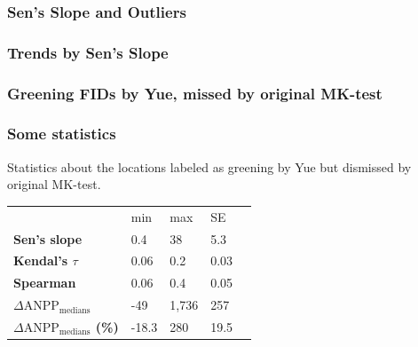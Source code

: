 \documentclass[serif, xcolor={dvipsnames}]{beamer} %
\begin{document}
\begin{frame}
 \frametitle{Sen's Slope and Outliers}
\begin{center}
\end{center}
\end{frame}
\begin{frame}
\frametitle{Trends by Sen's Slope}
\begin{center}
\end{center}
\end{frame}
\begin{frame}
\frametitle{Greening FIDs by Yue, missed by original MK-test}
\begin{center}
\end{center}
\end{frame}
\begin{frame}
\frametitle{Some statistics}
Statistics about the locations labeled as greening by Yue but dismissed by original MK-test.
\begin{table}[!ht]
\centering
\captionsetup{singlelinecheck=false, format=hang}
\label{tab:Trendcounts}
\begin{tabular}{lllll}
\bottomrule
\rowcolor{shadecolor} 
&  min & max & SE \\ 
\rowcolor{aliceblue} 
\textbf{Sen's slope} & 0.4 & 38 & 5.3 \\
\textbf{Kendal's $\tau$}  & 0.06 & 0.2 &  0.03 \\
\rowcolor{aliceblue} 
\textbf{Spearman}  & 0.06  & 0.4 & 0.05  \\
\textbf{\scriptsize $\Delta \text{ANPP}_{\text{medians}}$} & -49 & 1,736 & 257 \\
\rowcolor{aliceblue}\textbf{\scriptsize $\Delta \text{ANPP}_{\text{medians}}$ (\%)}  & -18.3 & 280 & 19.5 \\
\toprule
\end{tabular}
\end{table}
\end{frame}
\end{document}
